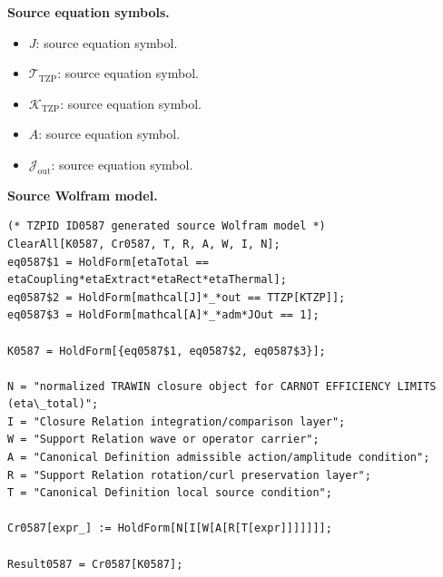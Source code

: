 \begin{minipage}[t]{0.49\linewidth}
\begingroup
\small
\raggedright
\textbf{Source equation symbols.}\par
\begin{itemize}[leftmargin=1.35em,itemsep=1pt,topsep=1pt,parsep=0pt]
    \item $J$: source equation symbol.
    \item $\mathcal{T}_{\mathrm{TZP}}$: source equation symbol.
    \item $\mathcal{K}_{\mathrm{TZP}}$: source equation symbol.
    \item $A$: source equation symbol.
    \item $\mathcal{J}_{\mathrm{out}}$: source equation symbol.
\end{itemize}
\endgroup
\end{minipage}\hfill
\begin{minipage}[t]{0.47\linewidth}
\begingroup
\scriptsize
\raggedright
\textbf{Source Wolfram model.}\par
\begin{Verbatim}[fontsize=\tiny,breaklines=true,breakanywhere=true]
(* TZPID ID0587 generated source Wolfram model *)
ClearAll[K0587, Cr0587, T, R, A, W, I, N];
eq0587$1 = HoldForm[etaTotal == etaCoupling*etaExtract*etaRect*etaThermal];
eq0587$2 = HoldForm[mathcal[J]*_*out == TTZP[KTZP]];
eq0587$3 = HoldForm[mathcal[A]*_*adm*JOut == 1];

K0587 = HoldForm[{eq0587$1, eq0587$2, eq0587$3}];

N = "normalized TRAWIN closure object for CARNOT EFFICIENCY LIMITS (eta\_total)";
I = "Closure Relation integration/comparison layer";
W = "Support Relation wave or operator carrier";
A = "Canonical Definition admissible action/amplitude condition";
R = "Support Relation rotation/curl preservation layer";
T = "Canonical Definition local source condition";

Cr0587[expr_] := HoldForm[N[I[W[A[R[T[expr]]]]]]];

Result0587 = Cr0587[K0587];
\end{Verbatim}
\endgroup
\end{minipage}


